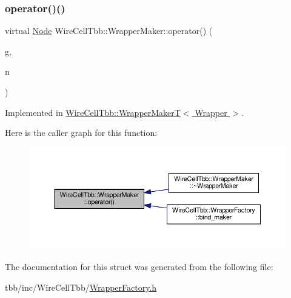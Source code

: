 \subsubsection{\texorpdfstring{operator()()}{operator()()}}
{\footnotesize\ttfamily virtual \hyperlink{namespace_wire_cell_tbb_aa7b6ff37a20e0174babf0614286bb59f}{Node} Wire\+Cell\+Tbb\+::\+Wrapper\+Maker\+::operator() (\begin{DoxyParamCaption}\item[{tbb\+::flow\+::graph \&}]{g,  }\item[{\hyperlink{class_wire_cell_1_1_interface_a09c548fb8266cfa39afb2e74a4615c37}{Wire\+Cell\+::\+I\+Node\+::pointer}}]{n }\end{DoxyParamCaption})\hspace{0.3cm}{\ttfamily [pure virtual]}}



Implemented in \hyperlink{struct_wire_cell_tbb_1_1_wrapper_maker_t_a582bbbeb058f68e79dd61c8c539e2718}{Wire\+Cell\+Tbb\+::\+Wrapper\+Maker\+T$<$ Wrapper $>$}.

Here is the caller graph for this function\+:
\nopagebreak
\begin{figure}[H]
\begin{center}
\leavevmode
\includegraphics[width=350pt]{struct_wire_cell_tbb_1_1_wrapper_maker_a65fa28063bf58c1358a2fc602d42cb42_icgraph}
\end{center}
\end{figure}


The documentation for this struct was generated from the following file\+:\begin{DoxyCompactItemize}
\item 
tbb/inc/\+Wire\+Cell\+Tbb/\hyperlink{_wrapper_factory_8h}{Wrapper\+Factory.\+h}\end{DoxyCompactItemize}
